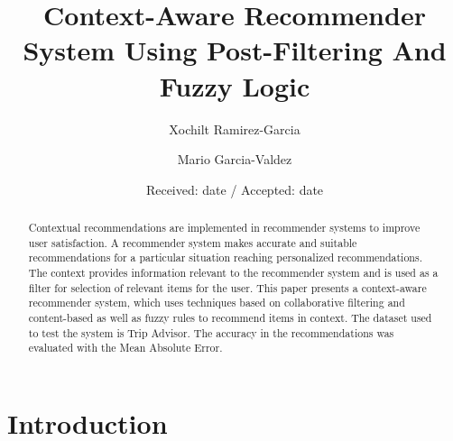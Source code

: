 \providecommand\foo{}
\renewcommand\foo{...}


\title{Context-Aware Recommender System Using Post-Filtering And Fuzzy Logic
}
\subtitle{}


\author{Xochilt Ramirez-Garcia \and Mario Garcia-Valdez %
}



\date{Received: date / Accepted: date}

\maketitle

\begin{abstract} 

Contextual recommendations are implemented in recommender systems to improve
user satisfaction. A recommender system makes accurate and suitable
recommendations for a particular situation reaching personalized
recommendations. The context provides information relevant to the recommender
system and is used as a filter for selection of relevant items for the user.
This paper presents a context-aware recommender system, which uses techniques
based on collaborative filtering and content-based as well as fuzzy rules to
recommend items in context. The dataset used to test the system is Trip Advisor.
The accuracy in the recommendations was evaluated with the Mean Absolute Error.

\end{abstract}

\section{Introduction} \label{intro} 

